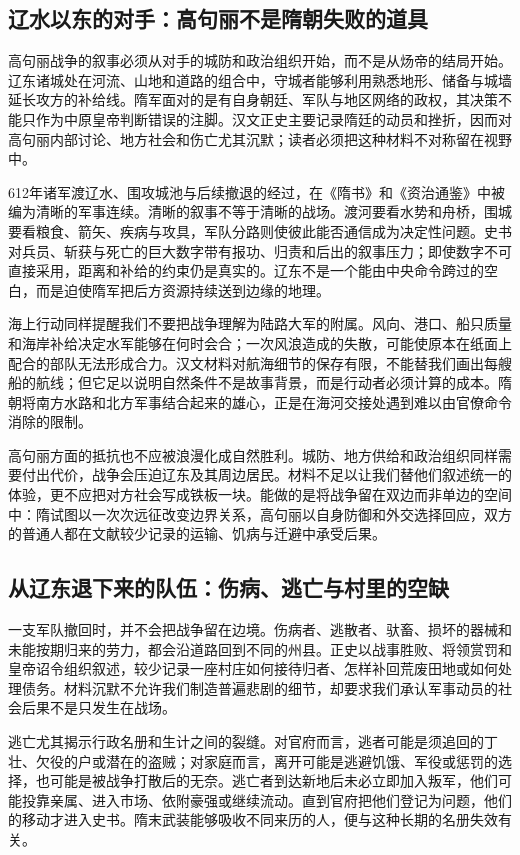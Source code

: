 \subsection{辽水以东的对手：高句丽不是隋朝失败的道具}
高句丽战争的叙事必须从对手的城防和政治组织开始，而不是从炀帝的结局开始。辽东诸城处在河流、山地和道路的组合中，守城者能够利用熟悉地形、储备与城墙延长攻方的补给线。隋军面对的是有自身朝廷、军队与地区网络的政权，其决策不能只作为中原皇帝判断错误的注脚。汉文正史主要记录隋廷的动员和挫折，因而对高句丽内部讨论、地方社会和伤亡尤其沉默；读者必须把这种材料不对称留在视野中。

612年诸军渡辽水、围攻城池与后续撤退的经过，在《隋书》和《资治通鉴》中被编为清晰的军事连续。清晰的叙事不等于清晰的战场。渡河要看水势和舟桥，围城要看粮食、箭矢、疾病与攻具，军队分路则使彼此能否通信成为决定性问题。史书对兵员、斩获与死亡的巨大数字带有报功、归责和后出的叙事压力；即使数字不可直接采用，距离和补给的约束仍是真实的。辽东不是一个能由中央命令跨过的空白，而是迫使隋军把后方资源持续送到边缘的地理。

海上行动同样提醒我们不要把战争理解为陆路大军的附属。风向、港口、船只质量和海岸补给决定水军能够在何时会合；一次风浪造成的失散，可能使原本在纸面上配合的部队无法形成合力。汉文材料对航海细节的保存有限，不能替我们画出每艘船的航线；但它足以说明自然条件不是故事背景，而是行动者必须计算的成本。隋朝将南方水路和北方军事结合起来的雄心，正是在海河交接处遇到难以由官僚命令消除的限制。

高句丽方面的抵抗也不应被浪漫化成自然胜利。城防、地方供给和政治组织同样需要付出代价，战争会压迫辽东及其周边居民。材料不足以让我们替他们叙述统一的体验，更不应把对方社会写成铁板一块。能做的是将战争留在双边而非单边的空间中：隋试图以一次次远征改变边界关系，高句丽以自身防御和外交选择回应，双方的普通人都在文献较少记录的运输、饥病与迁避中承受后果。

\subsection{从辽东退下来的队伍：伤病、逃亡与村里的空缺}
一支军队撤回时，并不会把战争留在边境。伤病者、逃散者、驮畜、损坏的器械和未能按期归来的劳力，都会沿道路回到不同的州县。正史以战事胜败、将领赏罚和皇帝诏令组织叙述，较少记录一座村庄如何接待归者、怎样补回荒废田地或如何处理债务。材料沉默不允许我们制造普遍悲剧的细节，却要求我们承认军事动员的社会后果不是只发生在战场。

逃亡尤其揭示行政名册和生计之间的裂缝。对官府而言，逃者可能是须追回的丁壮、欠役的户或潜在的盗贼；对家庭而言，离开可能是逃避饥饿、军役或惩罚的选择，也可能是被战争打散后的无奈。逃亡者到达新地后未必立即加入叛军，他们可能投靠亲属、进入市场、依附豪强或继续流动。直到官府把他们登记为问题，他们的移动才进入史书。隋末武装能够吸收不同来历的人，便与这种长期的名册失效有关。

